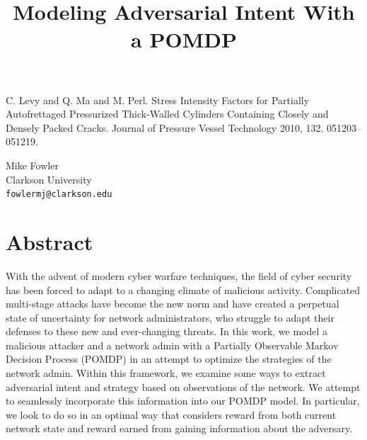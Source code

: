 \documentclass[article, A4, 11pt]{llncs}%
\begin{document}

\begin{thebibliography}{10}
{\sc C. Levy and Q. Ma and M. Perl}. {Stress Intensity Factors for Partially Autofrettaged Pressurized Thick-Walled Cylinders Containing Closely and Densely Packed Cracks}. Journal of Pressure Vessel Technology 2010, 132, 051203–051219.
\end{thebibliography} %

\title{Modeling Adversarial Intent With a POMDP}
 \author{} \institute{}
\maketitle
\begin{center}
{\large Mike  Fowler}\\
Clarkson University\\
{\tt fowlermj@clarkson.edu}
\end{center}

\section*{Abstract}
With the advent of modern cyber warfare techniques, the field of cyber security has been forced to adapt to a changing climate of malicious activity. Complicated multi-stage attacks have become the new norm and have created a perpetual state of uncertainty for network administrators, who struggle to adapt their defenses to these new and ever-changing threats. In this work, we model a malicious attacker and a network admin with a Partially Observable Markov Decision Process (POMDP) in an attempt to optimize the strategies of the network admin.  Within this framework, we examine some ways to extract adversarial intent and strategy based on observations of the network.  We attempt to seamlessly incorporate this information into our POMDP model. In particular, we look to do so in an optimal way that considers reward from both current network state and reward earned from gaining information about the adversary.
\end{document}
